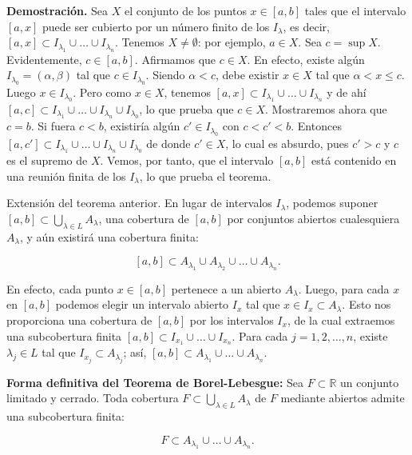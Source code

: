 \documentclass[12pt,oneside]{book}
\begin{document}
\textbf{Demostración.} Sea \(X\) el conjunto de los puntos \(x \in [a, b]\) tales que el intervalo \([a, x]\) puede ser cubierto por un número finito de los \(I_\lambda\), es decir, \([a, x] \subset I_{\lambda_1} \cup \dots \cup I_{\lambda_n}\). Tenemos \(X \neq \emptyset\): por ejemplo, \(a \in X\). Sea \(c = \sup X\). Evidentemente, \(c \in [a, b]\). Afirmamos que \(c \in X\). En efecto, existe algún \(I_{\lambda_0} = (\alpha, \beta)\) tal que \(c \in I_{\lambda_0}\). Siendo \(\alpha < c\), debe existir \(x \in X\) tal que \(\alpha < x \leq c\). Luego \(x \in I_{\lambda_0}\). Pero como \(x \in X\), tenemos \([a, x] \subset I_{\lambda_1} \cup \dots \cup I_{\lambda_n}\) y de ahí \([a, c] \subset I_{\lambda_1} \cup \dots \cup I_{\lambda_n} \cup I_{\lambda_0}\), lo que prueba que \(c \in X\). Mostraremos ahora que \(c = b\). Si fuera \(c < b\), existiría algún \(c' \in I_{\lambda_0}\) con \(c < c' < b\). Entonces \([a, c'] \subset I_{\lambda_1} \cup \dots \cup I_{\lambda_n} \cup I_{\lambda_0}\) de donde \(c' \in X\), lo cual es absurdo, pues \(c' > c\) y \(c\) es el supremo de \(X\). Vemos, por tanto, que el intervalo \([a, b]\) está contenido en una reunión finita de los \(I_\lambda\), lo que prueba el teorema.

Extensión del teorema anterior. En lugar de intervalos \(I_\lambda\), podemos suponer \([a, b] \subset \bigcup_{\lambda \in L} A_\lambda\), una cobertura de \([a, b]\) por conjuntos abiertos cualesquiera \(A_\lambda\), y aún existirá una cobertura finita:

\[
[a, b] \subset A_{\lambda_1} \cup A_{\lambda_2} \cup \dots \cup A_{\lambda_n}.
\]

En efecto, cada punto \(x \in [a, b]\) pertenece a un abierto \(A_\lambda\). Luego, para cada \(x\) en \([a, b]\) podemos elegir un intervalo abierto \(I_x\) tal que \(x \in I_x \subset A_\lambda\). Esto nos proporciona una cobertura de \([a, b]\) por los intervalos \(I_x\), de la cual extraemos una subcobertura finita \([a, b] \subset I_{x_1} \cup \dots \cup I_{x_n}\). Para cada \(j = 1, 2, \dots, n\), existe \(\lambda_j \in L\) tal que \(I_{x_j} \subset A_{\lambda_j}\); así, \([a, b] \subset A_{\lambda_1} \cup \dots \cup A_{\lambda_n}\).

\textbf{Forma definitiva del Teorema de Borel-Lebesgue:} Sea \(F \subset \mathbb{R}\) un conjunto limitado y cerrado. Toda cobertura \(F \subset \bigcup_{\lambda \in L} A_\lambda\) de \(F\) mediante abiertos admite una subcobertura finita:

\[
F \subset A_{\lambda_1} \cup \dots \cup A_{\lambda_n}.
\]
\end{document}
